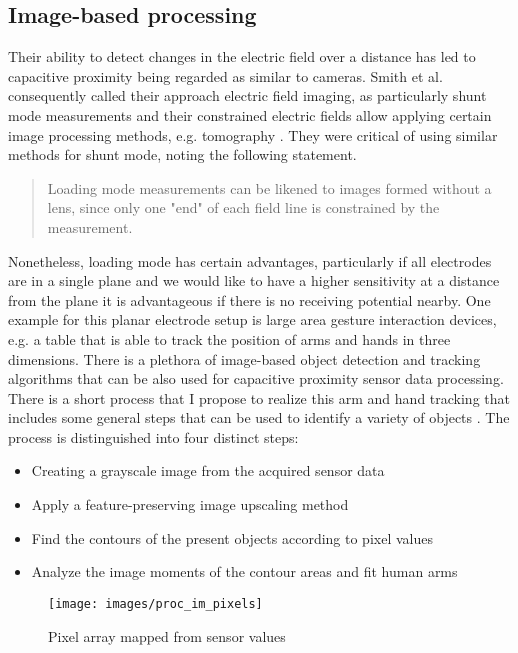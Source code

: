 \subsection{Image-based processing}
\label{ch:proc_image}
Their ability to detect changes in the electric field over a distance has led to capacitive proximity being regarded as similar to cameras. Smith et al. consequently called their approach electric field imaging, as particularly shunt mode measurements and their constrained electric fields allow applying certain image processing methods, e.g. tomography \cite{smith1999thesis}. They were critical of using similar methods for shunt mode, noting the following statement.
\begin{quote}
Loading mode measurements can be likened
to images formed without a lens, since only one "end" of
each field line is constrained by the measurement. \cite{smith1998electric}
\end{quote}
Nonetheless, loading mode has certain advantages, particularly if all electrodes are in a single plane and we would like to have a higher sensitivity at a distance from the plane it is advantageous if there is no receiving potential nearby. One example for this planar electrode setup is large area gesture interaction devices, e.g. a table that is able to track the position of arms and hands in three dimensions. There is a plethora of image-based object detection and tracking algorithms that can be also used for capacitive proximity sensor data processing. There is a short process that I propose to realize this arm and hand tracking that includes some general steps that can be used to identify a variety of objects \cite{Braun2013captap}. The process is distinguished into four distinct steps:
\begin{itemize}
\item Creating a grayscale image from the acquired sensor data
\item Apply a feature-preserving image upscaling method
\item Find the contours of the present objects according to pixel values
\item Analyze the image moments of the contour areas and fit human arms
\end{itemize} 

\begin{figure}[h]
\centering
\texttt{[image: images/proc\_im\_pixels]}
\caption{Pixel array mapped from sensor values}
\label{fig:proc_im_pixels}
\end{figure}

